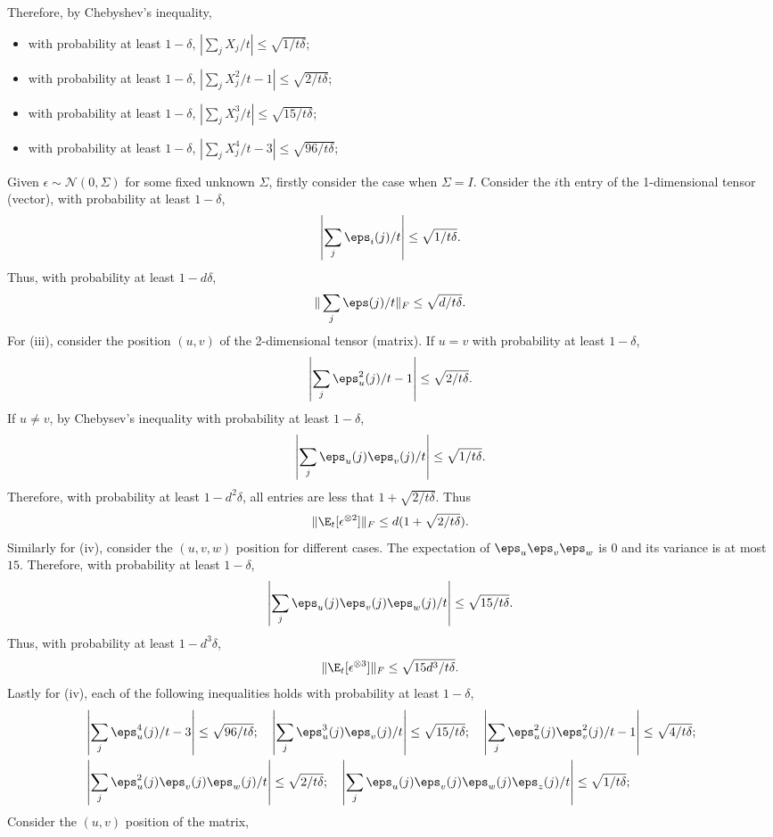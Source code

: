 Therefore, by Chebyshev's inequality,
\begin{itemize}
\item with probability at least $1-\delta$, $|\sum_j X_j/t| \le \sqrt{1/t\delta}$;
\item with probability at least $1-\delta$, $|\sum_j X_j^2/t -1 | \le \sqrt{2/t\delta}$;
\item with probability at least $1-\delta$, $|\sum_j X_j^3/t| \le \sqrt{15/t\delta}$;
\item with probability at least $1-\delta$, $|\sum_j X_j^4/t -3| \le \sqrt{96/t\delta}$;
\end{itemize}
Given $\epsilon \sim \mathcal{N}(0,\Sigma)$ for some fixed unknown $\Sigma$, firstly consider the case when $\Sigma = I$.
Consider the $i$th entry of the 1-dimensional tensor (vector), with probability at least $1-\delta$, 
\[
\left| \sum_j \eps_i(j)/t \right| \le \sqrt{1/t\delta}.
\]
Thus, with probability at least $1-d\delta$,
\[
\| \sum_j \eps(j)/t \|_F \le \sqrt{d/t\delta}.
\]
For (iii), consider the position $(u,v)$ of the 2-dimensional tensor (matrix). If $u=v$ with probability at least $1-\delta$,
\[
	\left| \sum_j \eps_u^2(j)/t - 1\right| \le \sqrt{2/t\delta}.
\]
If $u\neq v$, by Chebysev's inequality with probability at least $1-\delta$,
\[
	\left| \sum_j \eps_u(j)\eps_v(j)/t \right| \le  \sqrt{1/t\delta}.
\]
Therefore, with probability at least $1-d^2\delta$, all entries are less that $1+\sqrt{2/t\delta}$. Thus 
\[
\|\E_t[\epsilon^{\otimes 2}]\|_F \le d(1+\sqrt{2/t\delta}).
\]
Similarly for (iv), consider the $(u,v,w)$ position for different cases. The expectation of $\eps_u\eps_v\eps_w$ is 0 and its variance is at most  $15$. Therefore, with probability at least $1-\delta$,
\[
\left|\sum_j \eps_u(j)\eps_v(j)\eps_w(j)/t \right| \le \sqrt{15/t\delta}.
\]
Thus, with probability at least $1-d^3\delta$,
\[
\|\E_t[\epsilon^{\otimes 3}]\|_F \le \sqrt{15d^3/t\delta}.
\] 
Lastly for (iv), each of the following inequalities holds with probability at least $1-\delta$,
\begin{align*}
& \left| \sum_j\eps_u^4(j)/t -3 \right| \le \sqrt{96/t\delta}; \quad \left| \sum_j\eps_u^3(j)\eps_v(j)/t \right| \le \sqrt{15/t\delta}; \quad \left| \sum_j\eps_u^2(j)\eps_v^2(j)/t - 1\right| \le \sqrt{4/t\delta}; \\
&  \left| \sum_j\eps_u^2(j)\eps_v(j)\eps_w(j)/t \right| \le \sqrt{2/t\delta}; \quad \left| \sum_j\eps_u(j)\eps_v(j)\eps_w(j)\eps_z(j)/t \right| \le \sqrt{1/t\delta};
\end{align*}
Consider the $(u,v)$ position of the matrix,
